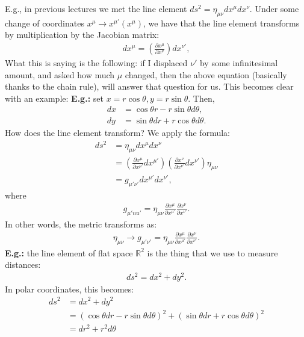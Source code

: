 \documentclass[11pt]{article}
\newcommand{\R}[0]{\mathbb{R}}
\newcommand{\srmetric}[0]{\eta_{\mu \nu}}
\theoremstyle{definition}
\begin{document}
\newline
\newline
E.g., in previous lectures we met the line element \( ds^2 = \eta_{\mu \nu} dx^\mu dx^\nu \).  Under some change of coordinates \( x^\mu \rightarrow x^{\mu'}(x^\mu) \), we have that the line element transforms by multiplication by the Jacobian matrix: 
\begin{align*}
	dx^\mu = \left( \frac{\partial x^\mu}{\partial x^\nu} \right) dx^{\nu'}, 
\end{align*}
What this is saying is the following: if I displaced \( \nu' \) by some infinitesimal amount, and asked how much \( \mu \) changed, then the above equation (basically thanks to the chain rule), will answer that question for us. This becomes clear with an example: 
\newline
\newline
\textbf{E.g.:} set \( x = r \cos \theta, y = r \sin \theta \). Then, 
\begin{align*}
	dx & = \cos \theta r -  r \sin \theta d \theta, \\
	dy & = \sin \theta dr + r \cos \theta d \theta. 
\end{align*}
How does the line element transform? We apply the formula:
\begin{align*}
	ds^2 & = \srmetric dx^\mu dx^\nu \\
		& = \left( \frac{\partial x^\mu}{\partial x^{\mu'}} dx^{\mu'} \right) \left( \frac{\partial x^\nu}{\partial x^{\nu'}} dx^{\nu'} \right) \srmetric \\
		& = g_{\mu' \nu'}dx^{\mu'} dx^{\nu'}, 
\end{align*}
where 
\begin{align*}
	g_{\mu' nu'} = \srmetric \frac{\partial x^\mu}{\partial x^{\mu'}} \frac{\partial x^\nu}{\partial x^{\nu'}}. 
\end{align*}
In other words, the metric transforms as: 
\begin{align*}
	\srmetric \rightarrow g_{\mu' \nu'} = \srmetric \frac{\partial x^\mu}{\partial x^{\mu'}} \frac{\partial x^\nu}{\partial x^{\nu'}}. 
\end{align*}
\textbf{E.g.:} the line element of flat space \( \R^2 \) is the thing that we use to measure distances: 
\begin{align*}
	ds^2 = dx^2 + dy^2. 
\end{align*}
In polar coordinates, this becomes: 
\begin{align*}
	ds^2 & = dx^2 + dy^2 \\
	& = ( \cos \theta dr - r \sin \theta d \theta)^2 + ( \sin \theta dr + r \cos \theta d \theta)^2 \\
	& = dr^2 + r^2 d \theta 
\end{align*}
\end{document}
